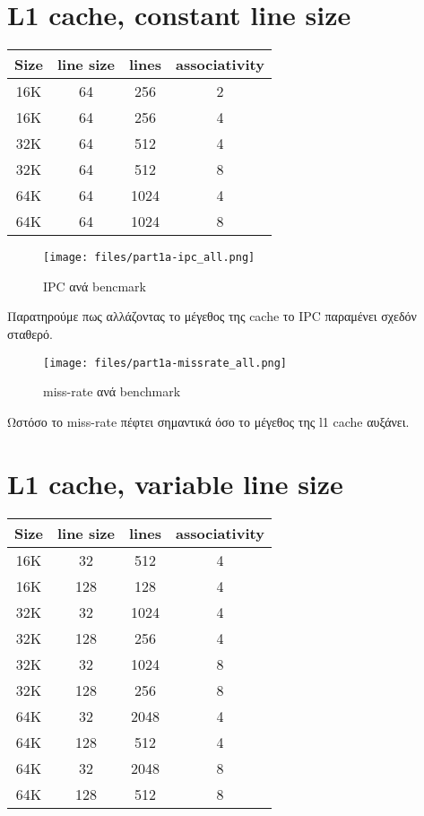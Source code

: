\documentclass[a4paper,9pt]{article}
\begin{document}
\def\thesection {\roman{section}: }



\section{L1 cache, constant line size}
\begin{tabular}{c c c c}
    Size & line size & lines & associativity\\ 
    \hline
    \hline
    16K   & 64 &  256  & 2\\
    16K   & 64 &  256  & 4\\
    \hline
    32K   & 64 &  512  & 4\\
    32K   & 64 &  512  & 8\\
    \hline
    64K   & 64 &  1024 & 4\\
    64K   & 64 &  1024 & 8\\
\end{tabular}
\begin{figure}[H]
    \centering
    \texttt{[image: files/part1a-ipc\_all.png]}
    \caption{IPC ανά bencmark}
\end{figure}

Παρατηρούμε πως αλλάζοντας το μέγεθος της cache το IPC παραμένει σχεδόν
σταθερό.

\begin{figure}[H]
    \centering
    \texttt{[image: files/part1a-missrate\_all.png]}
    \caption{miss-rate ανά benchmark}
\end{figure}

Ωστόσο το miss-rate πέφτει σημαντικά όσο το μέγεθος της l1 cache αυξάνει.


\pagebreak


\section{L1 cache, variable line size}

\begin{tabular}{c c c c}
    Size & line size &lines & associativity\\ 
    \hline
    \hline
    16K & 32    & 512   & 4\\
    16K & 128   & 128   & 4\\
    \hline
    32K & 32    & 1024  & 4\\
    32K & 128   & 256   & 4\\
    32K & 32    & 1024  & 8\\
    32K & 128   & 256   & 8\\
    \hline
    64K & 32    & 2048  & 4\\
    64K & 128   & 512   & 4\\
    64K & 32    & 2048  & 8\\
    64K & 128   & 512   & 8\\
\end{tabular}
\end{document}
